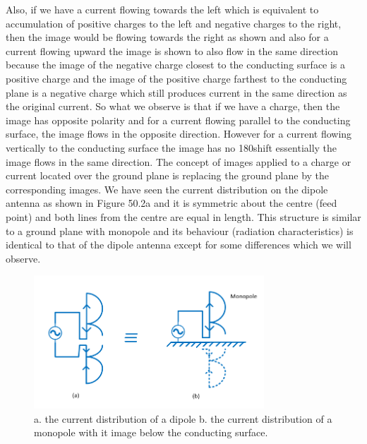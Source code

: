 Also, if we have a current flowing towards the left which is equivalent to accumulation of positive charges to the left and negative charges to the right, then the image would be flowing towards the right as shown and also for a current flowing upward the image is shown to also flow in the same direction because the image of the negative charge closest to the conducting surface is a positive charge and the image of the positive charge farthest to the conducting plane is a negative charge which still produces current in the same direction as the original current. So what we observe is that if we have a charge, then the image has opposite polarity and for a current flowing parallel to the conducting surface, the image flows in the opposite direction. However for a current flowing vertically to the conducting surface the image has no 180\textdegree \space shift essentially the image flows in the same direction. The concept of images applied to a charge or current located over the ground plane is replacing the ground plane by the corresponding images. We have seen the current distribution on the dipole antenna as shown in Figure 50.2a and it is symmetric about the centre (feed point) and both lines from the centre are equal in length. This structure is similar to a ground plane with monopole and its behaviour (radiation characteristics) is identical to that of the dipole antenna except for some differences which we will observe.

\begin{figure}[h]
\centering
\includegraphics[height=5cm]{./graphics/image53_2}
\caption{a. the current distribution of a dipole 
	b. the current distribution of a monopole with it image below the conducting surface.}
\label{fig:fig2}
\end{figure}

